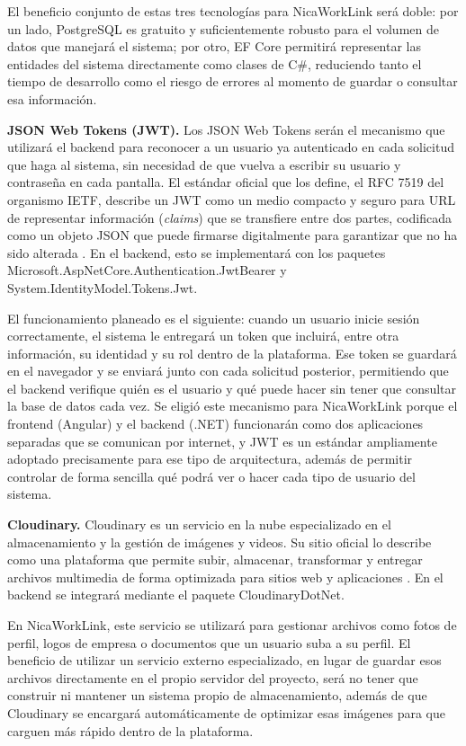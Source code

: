 El beneficio conjunto de estas tres tecnologías para NicaWorkLink será doble: por un lado, PostgreSQL es gratuito y suficientemente robusto para el volumen de datos que manejará el sistema; por otro, EF Core permitirá representar las entidades del sistema directamente como clases de C\#, reduciendo tanto el tiempo de desarrollo como el riesgo de errores al momento de guardar o consultar esa información.

\textbf{JSON Web Tokens (JWT).} Los JSON Web Tokens serán el mecanismo que utilizará el backend para reconocer a un usuario ya autenticado en cada solicitud que haga al sistema, sin necesidad de que vuelva a escribir su usuario y contraseña en cada pantalla. El estándar oficial que los define, el RFC 7519 del organismo IETF, describe un JWT como un medio compacto y seguro para URL de representar información (\textit{claims}) que se transfiere entre dos partes, codificada como un objeto JSON que puede firmarse digitalmente para garantizar que no ha sido alterada \parencite{jones2015}. En el backend, esto se implementará con los paquetes Microsoft.AspNetCore.Authentication.JwtBearer y System.IdentityModel.Tokens.Jwt.

El funcionamiento planeado es el siguiente: cuando un usuario inicie sesión correctamente, el sistema le entregará un token que incluirá, entre otra información, su identidad y su rol dentro de la plataforma. Ese token se guardará en el navegador y se enviará junto con cada solicitud posterior, permitiendo que el backend verifique quién es el usuario y qué puede hacer sin tener que consultar la base de datos cada vez. Se eligió este mecanismo para NicaWorkLink porque el frontend (Angular) y el backend (.NET) funcionarán como dos aplicaciones separadas que se comunican por internet, y JWT es un estándar ampliamente adoptado precisamente para ese tipo de arquitectura, además de permitir controlar de forma sencilla qué podrá ver o hacer cada tipo de usuario del sistema.

\textbf{Cloudinary.} Cloudinary es un servicio en la nube especializado en el almacenamiento y la gestión de imágenes y videos. Su sitio oficial lo describe como una plataforma que permite subir, almacenar, transformar y entregar archivos multimedia de forma optimizada para sitios web y aplicaciones \parencite{cloudinary}. En el backend se integrará mediante el paquete CloudinaryDotNet.

En NicaWorkLink, este servicio se utilizará para gestionar archivos como fotos de perfil, logos de empresa o documentos que un usuario suba a su perfil. El beneficio de utilizar un servicio externo especializado, en lugar de guardar esos archivos directamente en el propio servidor del proyecto, será no tener que construir ni mantener un sistema propio de almacenamiento, además de que Cloudinary se encargará automáticamente de optimizar esas imágenes para que carguen más rápido dentro de la plataforma.


